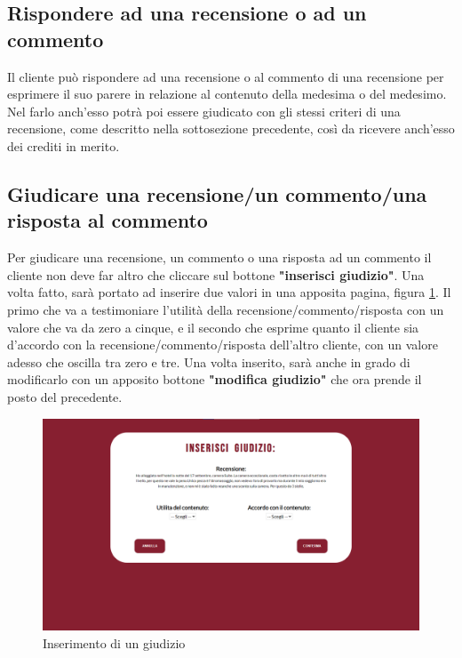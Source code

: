 \documentclass [a4paper, 12pt]{book}
\begin{document}
\subsection{Rispondere ad una recensione o ad un commento}
Il cliente può rispondere ad una recensione o al commento di una recensione per esprimere il suo parere in relazione al contenuto della medesima o del medesimo. Nel farlo anch'esso potrà poi essere giudicato con gli stessi criteri di una recensione, come descritto nella sottosezione precedente, così da ricevere anch'esso dei crediti in merito. 

\subsection{Giudicare una recensione/un commento/una risposta al commento}
Per giudicare una recensione, un commento o una risposta ad un commento il cliente non deve far altro che cliccare sul bottone \textbf{"inserisci giudizio"}. Una volta fatto, sarà portato ad inserire due valori in una apposita pagina, figura \ref{InserisciGiudizio}. Il primo che va a testimoniare l'utilità della recensione/commento/risposta con un valore che va da zero a cinque, e il secondo che esprime quanto il cliente sia d'accordo con la recensione/commento/risposta dell'altro cliente, con un valore adesso che oscilla tra zero e tre. Una volta inserito, sarà anche in grado di modificarlo con un apposito bottone \textbf{"modifica giudizio"} che ora prende il posto del precedente. 
\begin{figure}[!h]
\centering
\includegraphics[scale=0.3]{InserisciGiudizio.png}
\caption{Inserimento di un giudizio}
\label{InserisciGiudizio}
\end{figure}
\end{document}
